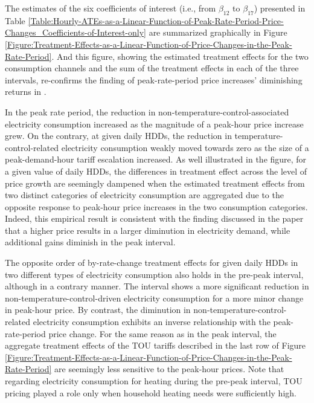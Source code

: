 The estimates of the six coefficients of interest (i.e., from $\beta_{12}$ to $\beta_{17}$) presented in Table \ref{Table:Hourly-ATEs-as-a-Linear-Function-of-Peak-Rate-Period-Price-Changes_Coefficients-of-Interest-only} are summarized graphically in Figure \ref{Figure:Treatment-Effects-as-a-Linear-Function-of-Price-Changes-in-the-Peak-Rate-Period}. And this figure, showing the estimated treatment effects for the two consumption channels and the sum of the treatment effects in each of the three intervals, re-confirms the finding of peak-rate-period price increases' diminishing returns in \cite{Peaking-Interest:How-Awareness-Drives-the-Effectiveness-of-Time-of-Use-Electricity-Pricing_Prest_2020}. 

In the peak rate period, the reduction in non-temperature-control-associated electricity consumption increased as the magnitude of a peak-hour price increase grew. On the contrary, at given daily HDDs, the reduction in temperature-control-related electricity consumption weakly moved towards zero as the size of a peak-demand-hour tariff escalation increased. As well illustrated in the figure, for a given value of daily HDDs, the differences in treatment effect across the level of price growth are seemingly dampened when the estimated treatment effects from two distinct categories of electricity consumption are aggregated due to the opposite response to peak-hour price increases in the two consumption categories. Indeed, this empirical result is consistent with the finding discussed in the paper that a higher price results in a larger diminution in electricity demand, while additional gains diminish in the peak interval.  

The opposite order of by-rate-change treatment effects for given daily HDDs in two different types of electricity consumption also holds in the pre-peak interval, although in a contrary manner. The interval shows a more significant reduction in non-temperature-control-driven electricity consumption for a more minor change in peak-hour price. By contrast, the diminution in non-temperature-control-related electricity consumption exhibits an inverse relationship with the peak-rate-period price change. For the same reason as in the peak interval, the aggregate treatment effects of the TOU tariffs described in the last row of Figure \ref{Figure:Treatment-Effects-as-a-Linear-Function-of-Price-Changes-in-the-Peak-Rate-Period} are seemingly less sensitive to the peak-hour prices. Note that regarding electricity consumption for heating during the pre-peak interval, TOU pricing played a role only when household heating needs were sufficiently high. 

